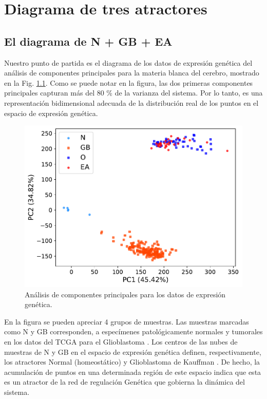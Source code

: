 \chapter{Diagrama de tres atractores}
\label{cap2}
\onehalfspacing


\section{El diagrama de N + GB + EA}\label{sec:ngbad}

Nuestro punto de partida es el diagrama de los datos de expresión genética del análisis de componentes principales para la materia blanca del cerebro, mostrado en la Fig. \ref{fig:fig1a}. Como se puede notar en la figura, las dos primeras componentes principales capturan más del 80 \% de la varianza del sistema. Por lo tanto, es una representación bidimensional adecuada de la distribución real de los puntos en el espacio de expresión genética.

\begin{figure}[!htb]
	\centering
	\includegraphics[width=0.75\linewidth]{figures/Fig_1a.pdf}
	\caption{\label{fig:fig1a}
		Análisis de componentes principales para los datos de expresión genética.}
\end{figure}

En la figura se pueden apreciar 4 grupos de muestras. Las muestras marcadas como N y GB corresponden, a especímenes patológicamente normales y tumorales en los datos del TCGA para el Glioblastoma \cite{Brennan_2013}. Los centros de las nubes de muestras de N y GB en el espacio de expresión genética definen, respectivamente, los atractores Normal (homeostático) y Glioblastoma de Kauffman \cite{Huang_2009, Gonzalez_2023}. De hecho, la acumulación de puntos en una determinada región de este espacio indica que esta es un atractor de la red de regulación Genética que gobierna la dinámica del sistema.

